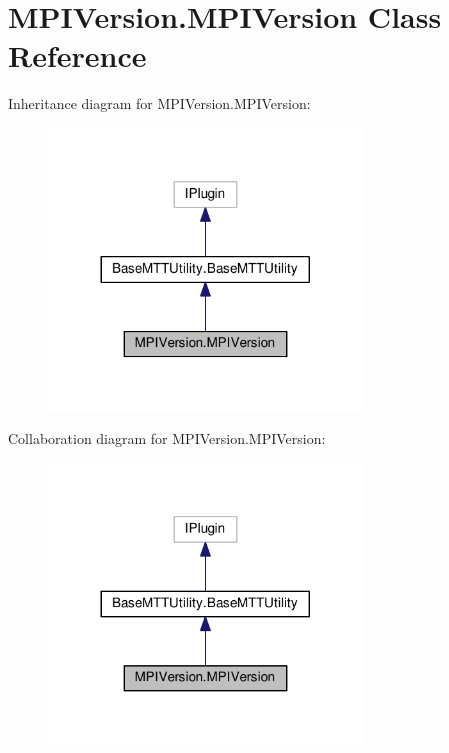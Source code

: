 \hypertarget{classMPIVersion_1_1MPIVersion}{\section{M\-P\-I\-Version.\-M\-P\-I\-Version Class Reference}
\label{classMPIVersion_1_1MPIVersion}
}


Inheritance diagram for M\-P\-I\-Version.\-M\-P\-I\-Version\-:
\nopagebreak
\begin{figure}[H]
\begin{center}
\leavevmode
\includegraphics[width=236pt]{classMPIVersion_1_1MPIVersion__inherit__graph}
\end{center}
\end{figure}


Collaboration diagram for M\-P\-I\-Version.\-M\-P\-I\-Version\-:
\nopagebreak
\begin{figure}[H]
\begin{center}
\leavevmode
\includegraphics[width=236pt]{classMPIVersion_1_1MPIVersion__coll__graph}
\end{center}
\end{figure}
